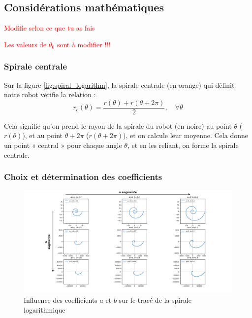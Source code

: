 \documentclass[a4paper, 11pt]{report}
\begin{document}
    \subsection{Considérations mathématiques}

        \textcolor{red}{Modifie selon ce que tu as fais}

        \textcolor{red}{Les valeurs de $\theta_0$ sont à modifier !!!}

        \subsubsection{Spirale centrale}
            
            Sur la figure \ref{fig:spiral_logarithm}, la spirale centrale (en orange) qui définit notre robot vérifie la relation :
            \begin{equation}
            r_c(\theta) = \frac{r(\theta) + r(\theta + 2\pi)}{2}, \quad \forall \theta
            \label{eq:spirale_centrale}
            \end{equation}
            
            Cela signifie qu’on prend le rayon de la spirale du robot (en noire) au point $\theta$ ($r(\theta)$), et au point $\theta + 2\pi$ ($r(\theta + 2\pi)$), et on calcule leur moyenne. Cela donne un point « central » pour chaque angle $\theta$, et en les reliant, on forme la spirale centrale. \cite{wang_spirobs_2025}

        \subsubsection{Choix et détermination des coefficients}

            \begin{figure}
                \centering
                \includegraphics[width=1\textwidth]{Figures/spirale.png}
                \caption{Influence des coefficients $a$ et $b$ sur le tracé de la spirale logarithmique}
                \label{fig:spirale}
            \end{figure}
        
\end{document}
